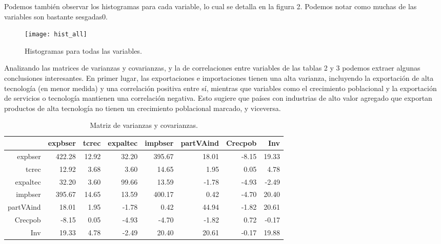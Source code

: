 \documentclass[a4paper,10pt]{article}
\begin{document}
Podemos también observar los histogramas para cada variable, lo cual se detalla en la figura 2. Podemos notar como muchas de las variables son bastante
sesgadas0.

\begin{figure}[ht]
\centering
\texttt{[image: hist\_all]}
\caption{Histogramas para todas las variables.}
\end{figure}

Analizando las matrices de varianzas y covarianzas, y la de correlaciones entre variables de las tablas 2 y 3 podemos extraer algunas conclusiones
interesantes. En primer lugar, las exportaciones e importaciones tienen una alta varianza, incluyendo la exportación de alta tecnología (en menor medida) y 
una correlación positiva entre sí, mientras que variables como el crecimiento poblacional y la exportación de servicios o tecnología mantienen una 
correlación negativa. Esto sugiere que países con industrias de alto valor agregado que exportan productos de alta tecnología no tienen un crecimiento
poblacional marcado, y viceversa.

\begin{table}[ht]
\centering
\begin{tabular}{rrrrrrrr}
  \hline
 & expbser & tcrec & expaltec & impbser & partVAind & Crecpob & Inv \\ 
  \hline
expbser & 422.28 & 12.92 & 32.20 & 395.67 & 18.01 & -8.15 & 19.33 \\ 
  tcrec & 12.92 & 3.68 & 3.60 & 14.65 & 1.95 & 0.05 & 4.78 \\ 
  expaltec & 32.20 & 3.60 & 99.66 & 13.59 & -1.78 & -4.93 & -2.49 \\ 
  impbser & 395.67 & 14.65 & 13.59 & 400.17 & 0.42 & -4.70 & 20.40 \\ 
  partVAind & 18.01 & 1.95 & -1.78 & 0.42 & 44.94 & -1.82 & 20.61 \\ 
  Crecpob & -8.15 & 0.05 & -4.93 & -4.70 & -1.82 & 0.72 & -0.17 \\ 
  Inv & 19.33 & 4.78 & -2.49 & 20.40 & 20.61 & -0.17 & 19.88 \\ 
   \hline
\end{tabular}
\caption{Matriz de varianzas y covarianzas.}
\end{table}
\end{document}
